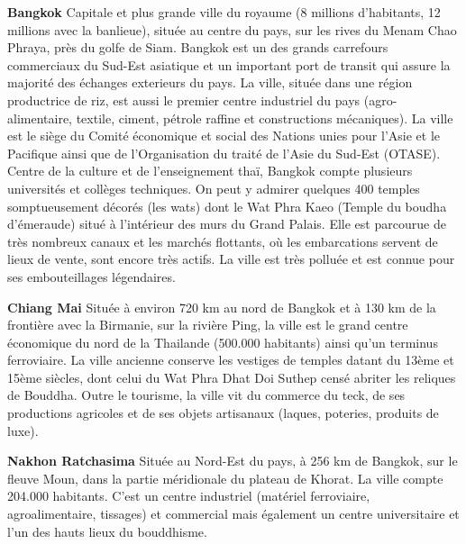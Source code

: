 \begin{multicols}{2}
\textbf{Bangkok}
Capitale et plus grande ville du royaume (8 millions d’habitants, 12 millions avec la banlieue), située au centre du pays, sur les rives du Menam Chao Phraya, près du golfe de Siam. Bangkok est un des grands carrefours commerciaux du Sud-Est asiatique et un important port de transit qui assure la majorité des échanges exterieurs du pays. La ville, située dans une région productrice de riz, est aussi le premier centre industriel du pays (agro-alimentaire, textile, ciment, pétrole raffine et constructions mécaniques). La ville est le siège du Comité économique et social des Nations unies pour l’Asie et le Pacifique ainsi que de l’Organisation du traité de l’Asie du Sud-Est (OTASE). Centre de la culture et de l’enseignement thaï, Bangkok compte plusieurs universités et collèges techniques. On peut y admirer quelques 400 temples somptueusement décorés (les wats) dont le Wat Phra Kaeo (Temple du boudha d’émeraude) situé à l’intérieur des murs du Grand Palais. Elle est parcourue de très nombreux canaux et les marchés flottants, où les embarcations servent de lieux de vente, sont encore très actifs. La ville est très polluée et est connue pour ses embouteillages légendaires.

\textbf{Chiang Mai}
Située à environ 720 km au nord de Bangkok et à 130 km de la frontière avec la Birmanie, sur la rivière Ping, la ville est le grand centre économique du nord de la Thailande (500.000 habitants) ainsi qu’un terminus ferroviaire. La ville ancienne conserve les vestiges de temples datant du 13ème et 15ème siècles, dont celui du Wat Phra Dhat Doi Suthep censé abriter les reliques de Bouddha. Outre le tourisme, la ville vit du commerce du teck, de ses productions agricoles et de ses objets artisanaux (laques, poteries, produits de luxe).

\textbf{Nakhon Ratchasima}
Située au Nord-Est du pays, à 256 km de Bangkok, sur le fleuve Moun, dans la partie méridionale du plateau de Khorat. La ville compte 204.000 habitants. C’est un centre industriel (matériel ferroviaire, agroalimentaire, tissages) et commercial mais également un centre universitaire et l’un des hauts lieux du bouddhisme.

\end{multicols}

\vfill
